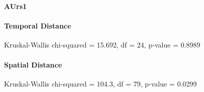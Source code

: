 


\large
\centerline{\textbf{AUrs1}}
\normalsize

\paragraph{Temporal Distance}
Kruskal-Wallis chi-squared = 15.692, df = 24, p-value = 0.8989

\paragraph{Spatial Distance}
Kruskal-Wallis chi-squared = 104.3, df = 79, p-value = 0.0299

